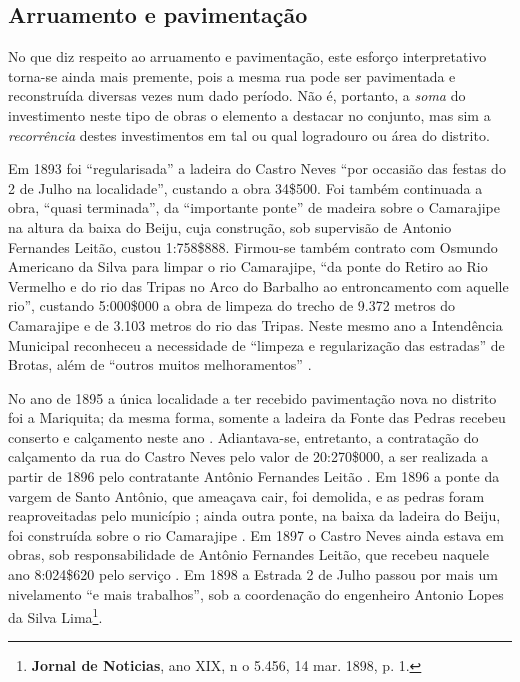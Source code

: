 \subsection{Arruamento e pavimentação}

No que diz respeito ao arruamento e pavimentação, este esforço interpretativo torna-se ainda mais premente, pois a mesma rua pode ser pavimentada e reconstruída diversas vezes num dado período. Não é, portanto, a \textit{soma} do investimento neste tipo de obras o elemento a destacar no conjunto, mas sim a \textit{recorrência} destes investimentos em tal ou qual logradouro ou área do distrito.

Em 1893 foi ``regularisada'' a ladeira do Castro Neves ``por occasião das festas
do 2 de Julho na localidade'', custando a obra 34\$500. Foi também continuada a obra, ``quasi terminada'', da ``importante ponte'' de madeira sobre o Camarajipe na altura da baixa do Beiju, cuja construção, sob supervisão de Antonio Fernandes Leitão, custou 1:758\$888. Firmou-se também contrato com Osmundo Americano da Silva para limpar o rio Camarajipe, ``da ponte do Retiro ao Rio Vermelho e do rio das Tripas no Arco do Barbalho ao entroncamento com aquelle rio'', custando 5:000\$000 a obra de limpeza do trecho de 9.372 metros do Camarajipe e de 3.103 metros do rio das Tripas. Neste mesmo ano a Intendência Municipal reconheceu a necessidade de ``limpeza e regularização das estradas'' de Brotas, além de ``outros muitos melhoramentos'' \cite[pp.~47-48; anexo 3, pp.~18-19]{salvador_relatorio_1893}.

No ano de 1895 a única localidade a ter recebido pavimentação nova no distrito foi a Mariquita; da mesma forma, somente a ladeira da Fonte das
Pedras recebeu conserto e calçamento neste ano \cite[p.~16]{salvador_relatorio_1895}. Adiantava-se, entretanto, a contratação do calçamento da rua do Castro Neves pelo valor de 20:270\$000, a ser realizada a partir de 1896 pelo contratante Antônio Fernandes Leitão \cite[p.~23]{salvador_relatorio_1895}. Em 1896 a ponte da vargem de Santo Antônio, que ameaçava cair, foi demolida, e as pedras foram reaproveitadas pelo município \cite[p.~137]{salvador_relatorio_1895}; ainda outra ponte, na baixa da ladeira do Beiju, foi construída sobre o rio Camarajipe \cite[p.~156]{salvador_relatorio_1894}. Em 1897 o Castro Neves ainda estava em obras, sob responsabilidade de Antônio Fernandes Leitão, que recebeu naquele ano 8:024\$620 pelo serviço \cite[p.~99]{salvador_relatorio_1897}. Em 1898 a Estrada 2 de Julho passou por mais um nivelamento ``e mais trabalhos'', sob a coordenação do engenheiro Antonio Lopes da Silva Lima\footnote{\textbf{Jornal de Noticias}, ano XIX, n o 5.456, 14 mar. 1898, p. 1.}.

